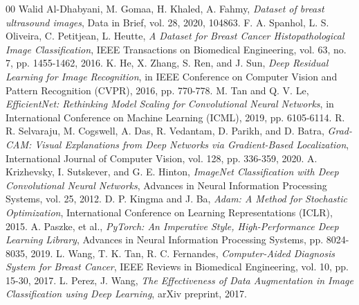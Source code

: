 \documentclass[conference,a4paper]{IEEEtran}
\begin{document}
\begin{thebibliography}{00}
 Walid Al-Dhabyani, M. Gomaa, H. Khaled, A. Fahmy, \emph{Dataset of breast ultrasound images}, Data in Brief, vol. 28, 2020, 104863.
 F. A. Spanhol, L. S. Oliveira, C. Petitjean, L. Heutte, \emph{A Dataset for Breast Cancer Histopathological Image Classification}, IEEE Transactions on Biomedical Engineering, vol. 63, no. 7, pp. 1455-1462, 2016.
 K. He, X. Zhang, S. Ren, and J. Sun, \emph{Deep Residual Learning for Image Recognition}, in IEEE Conference on Computer Vision and Pattern Recognition (CVPR), 2016, pp. 770-778.
 M. Tan and Q. V. Le, \emph{EfficientNet: Rethinking Model Scaling for Convolutional Neural Networks}, in International Conference on Machine Learning (ICML), 2019, pp. 6105-6114.
 R. R. Selvaraju, M. Cogswell, A. Das, R. Vedantam, D. Parikh, and D. Batra, \emph{Grad-CAM: Visual Explanations from Deep Networks via Gradient-Based Localization}, International Journal of Computer Vision, vol. 128, pp. 336-359, 2020.
 A. Krizhevsky, I. Sutskever, and G. E. Hinton, \emph{ImageNet Classification with Deep Convolutional Neural Networks}, Advances in Neural Information Processing Systems, vol. 25, 2012.
 D. P. Kingma and J. Ba, \emph{Adam: A Method for Stochastic Optimization}, International Conference on Learning Representations (ICLR), 2015.
 A. Paszke, et al., \emph{PyTorch: An Imperative Style, High-Performance Deep Learning Library}, Advances in Neural Information Processing Systems, pp. 8024-8035, 2019.
 L. Wang, T. K. Tan, R. C. Fernandes, \emph{Computer-Aided Diagnosis System for Breast Cancer}, IEEE Reviews in Biomedical Engineering, vol. 10, pp. 15-30, 2017.
 L. Perez, J. Wang, \emph{The Effectiveness of Data Augmentation in Image Classification using Deep Learning}, arXiv preprint, 2017.

\end{thebibliography}
\end{document}

